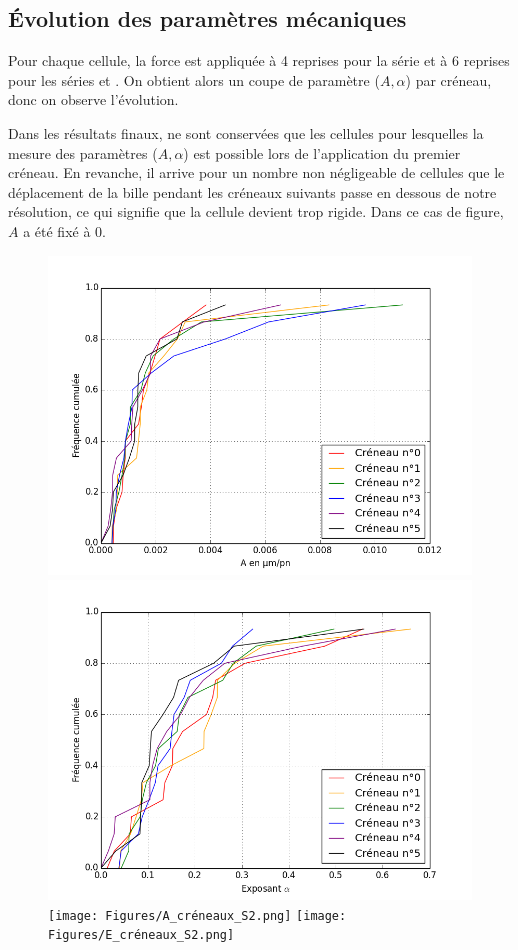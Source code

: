 \subsection{\'Evolution des paramètres mécaniques}

Pour chaque cellule, la force est appliquée à 4 reprises pour la série  et à 6 reprises pour les séries  et . On obtient alors un coupe de paramètre ($A,\alpha$) par créneau, donc on observe l'évolution. 

Dans les résultats finaux, ne sont conservées que les cellules pour lesquelles la mesure des paramètres ($A, \alpha$) est possible lors de l'application du premier créneau. 
En revanche, il arrive pour un nombre non négligeable de cellules que le déplacement de la bille pendant les créneaux suivants passe en dessous de notre résolution, ce qui signifie que la cellule devient trop rigide. Dans ce cas de figure, $A$ a été fixé à 0. 

\begin{figure}
\includegraphics[scale=0.3]{Figures/A_créneaux_témoin.png}
\includegraphics[scale=0.3]{Figures/E_créneaux_témoin.png} 
\\
\texttt{[image: Figures/A\_créneaux\_S2.png]} 
\texttt{[image: Figures/E\_créneaux\_S2.png]} 
\caption{\label{Evolution_6c}} 
\end{figure}

